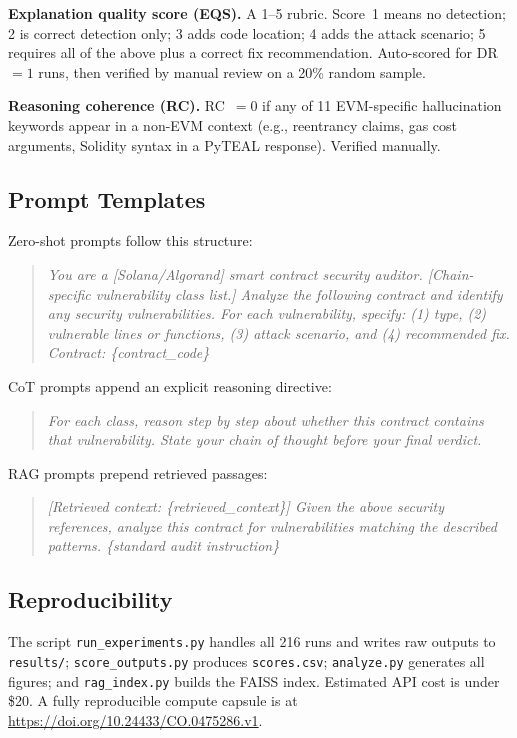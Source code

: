 \documentclass[runningheads]{llncs}
\begin{document}
\textbf{Explanation quality score (EQS).} A 1--5 rubric.
Score~1 means no detection; 2 is correct detection only; 3 adds code location;
4 adds the attack scenario; 5 requires all of the above plus a correct fix
recommendation.
Auto-scored for DR~$= 1$ runs, then verified by manual review on a 20\%
random sample.

\textbf{Reasoning coherence (RC).} RC~$= 0$ if any of 11 EVM-specific
hallucination keywords appear in a non-EVM context (e.g., reentrancy claims,
gas cost arguments, Solidity syntax in a PyTEAL response).
Verified manually.

\subsection{Prompt Templates}

Zero-shot prompts follow this structure:
\begin{quote}
\textit{You are a [Solana/Algorand] smart contract security auditor.
[Chain-specific vulnerability class list.] Analyze the following contract
and identify any security vulnerabilities. For each vulnerability, specify:
(1) type, (2) vulnerable lines or functions, (3) attack scenario, and
(4) recommended fix. Contract: \{contract\_code\}}
\end{quote}

CoT prompts append an explicit reasoning directive:
\begin{quote}
\textit{For each class, reason step by step about whether this contract contains
that vulnerability. State your chain of thought before your final verdict.}
\end{quote}

RAG prompts prepend retrieved passages:
\begin{quote}
\textit{[Retrieved context: \{retrieved\_context\}] Given the above security
references, analyze this contract for vulnerabilities matching the described
patterns. \{standard audit instruction\}}
\end{quote}

\subsection{Reproducibility}

The script \texttt{run\_experiments.py} handles all 216 runs and writes raw
outputs to \texttt{results/}; \texttt{score\_outputs.py} produces
\texttt{scores.csv}; \texttt{analyze.py} generates all figures; and
\texttt{rag\_index.py} builds the FAISS index.
Estimated API cost is under \$20.
A fully reproducible compute capsule is at
\url{https://doi.org/10.24433/CO.0475286.v1}.
\end{document}
